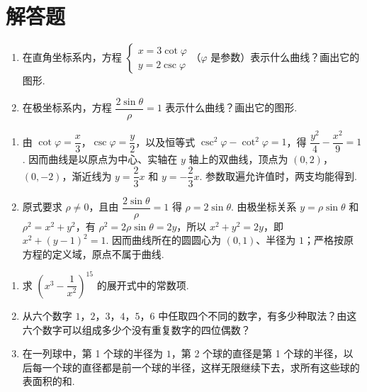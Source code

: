 \documentclass[UTF8,a4paper,oneside,11pt]{ctexbook}
\begin{document}
\section{解答题}

\begin{problem}

\begin{enumerate}
\item 在直角坐标系内，方程 \(\begin{cases}
x=3\cot\varphi\\
y=2\csc\varphi
\end{cases}\)（\(\varphi\) 是参数）表示什么曲线？画出它的图形.
\item 在极坐标系内，方程 \(\dfrac{2\sin\theta}{\rho}=1\) 表示什么曲线？画出它的图形.
\end{enumerate}
\end{problem}

\begin{solution}
\begin{enumerate}
\item 由 \(\cot\varphi=\dfrac{x}{3}\)，\(\csc\varphi=\dfrac{y}{2}\)，以及恒等式 \(\csc^2\varphi-\cot^2\varphi=1\)，得 \(\dfrac{y^2}{4}-\dfrac{x^2}{9}=1\). 因而曲线是以原点为中心、实轴在 \(y\) 轴上的双曲线，顶点为 \((0,2)\)，\((0,-2)\)，渐近线为 \(y=\dfrac{2}{3}x\) 和 \(y=-\dfrac{2}{3}x\). 参数取遍允许值时，两支均能得到.
\item 原式要求 \(\rho\ne0\)，且由 \(\dfrac{2\sin\theta}{\rho}=1\) 得 \(\rho=2\sin\theta\). 由极坐标关系 \(y=\rho\sin\theta\) 和 \(\rho^2=x^2+y^2\)，有 \(\rho^2=2\rho\sin\theta=2y\)，所以 \(x^2+y^2=2y\)，即 \(x^2+\left(y-1\right)^2=1\). 因而曲线所在的圆圆心为 \((0,1)\)、半径为 \(1\)；严格按原方程的定义域，原点不属于曲线.
\end{enumerate}
\end{solution}

\begin{problem}

\begin{enumerate}
\item 求 \(\left(x^{3}-\dfrac{1}{x^{2}}\right)^{15}\) 的展开式中的常数项.

\item 从六个数字 \(1\)，\(2\)，\(3\)，\(4\)，\(5\)，\(6\) 中任取四个不同的数字，有多少种取法？由这六个数字可以组成多少个没有重复数字的四位偶数？

\item 在一列球中，第 1 个球的半径为 \(1\)，第 2 个球的直径是第 1 个球的半径，以后每一个球的直径都是前一个球的半径，这样无限继续下去，求所有这些球的表面积的和.
\end{enumerate}
\end{problem}
\end{document}
